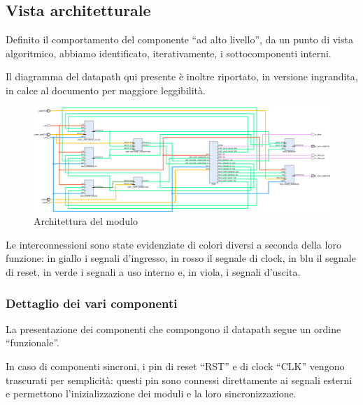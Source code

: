\documentclass[a4paper]{article}
\begin{document}
\subsection{Vista architetturale}

Definito il comportamento del componente “ad alto livello”, da un punto di vista algoritmico, abbiamo identificato, iterativamente, i sottocomponenti interni.

Il diagramma del datapath qui presente è inoltre riportato, in versione ingrandita, in calce al documento per maggiore leggibilità.

\begin{figure}[H]
    \centerline{
    \includegraphics[width=1.3\textwidth]{resources/Datapath.png}
    }
\caption{Architettura del modulo}
\end{figure}

Le interconnessioni sono state evidenziate di colori diversi a seconda della loro funzione: in giallo i segnali d’ingresso, in rosso il segnale di clock, in blu il segnale di reset, in verde i segnali a uso interno e, in viola, i segnali d’uscita.

\subsubsection{Dettaglio dei vari componenti}

La presentazione dei componenti che compongono il datapath segue un ordine “funzionale”.

In caso di componenti sincroni, i pin di reset “RST” e di clock “CLK” vengono trascurati per semplicità: questi pin sono connessi direttamente ai segnali esterni e permettono l’inizializzazione dei moduli e la loro sincronizzazione.
\end{document}

